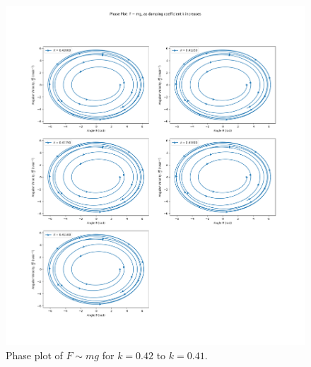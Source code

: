 \documentclass[10pt, twocolumn]{article}
\begin{document}
\begin{figure}
    \centering
    \includegraphics[width = \columnwidth]{Projects/ForcedSimplePendulum/Plots/Phase plot of F~mg as damping coefficient k increases from 0.42 to 0.41.png}
    \caption{Phase plot of $F \sim{mg}$ for $k = 0.42$ to $k = 0.41$.}
    \label{Phase plot of k 0.42 to 0.41}
\end{figure}
\end{document}
